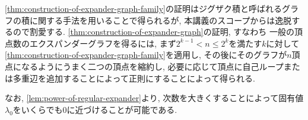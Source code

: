 \cref{thm:construction-of-expander-graph-family}の証明はジグザク積と呼ばれるグラフの積に関する手法を用いることで得られるが, 本講義のスコープからは逸脱するので割愛する.
\cref{thm:construction-of-expander-graph}の証明, すなわち
一般の頂点数のエクスパンダーグラフを得るには, まず$2^{k-1}< n \le 2^k$を満たす$k$に対して\cref{thm:construction-of-expander-graph-family}を適用し, その後にそのグラフが$n$頂点になるようにうまく二つの頂点を縮約し, 必要に応じて頂点に自己ループまたは多重辺を追加することによって正則にすることによって得られる.


なお, \cref{lem:power-of-regular-expander}より, 次数を大きくすることによって固有値$\lambda_0$をいくらでも$0$に近づけることが可能である.






